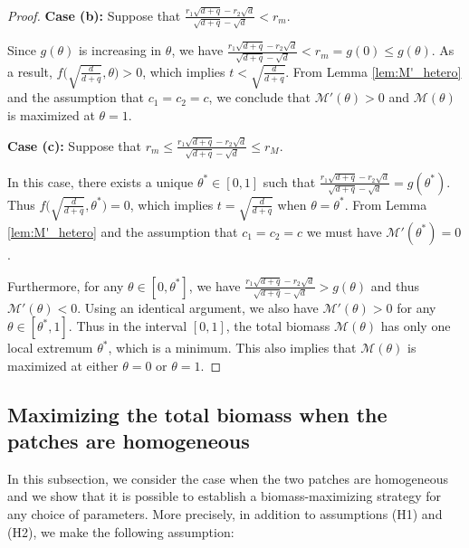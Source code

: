 \documentclass[11pt]{article}
\def\MM{\mathcal{M}}
\theoremstyle{definition}
\begin{document}
\begin{proof}
\vspace{.1in}
\noindent\textbf{Case (b):} Suppose that
$\frac{r_1\sqrt{d+q}-r_2\sqrt{d}}{\sqrt{d+q}-\sqrt{d}}<r_m$.

Since $g(\theta)$ is increasing in $\theta$, we have $\frac{r_1\sqrt{d+q}-r_2\sqrt{d}}{\sqrt{d+q}-\sqrt{d}}<r_m=g(0)\leq g(\theta)$. As a result, 
$f\big(\sqrt{\frac{d}{d+q}},\theta\big) >0$, which implies $t<\sqrt{\frac{d}{d+q}}$. From Lemma \ref{lem:M'_hetero} and the assumption that $c_1=c_2=c$, we  conclude that $\MM'(\theta)>0$ and $\MM(\theta)$ is maximized at $\theta=1$.

\vspace{.1in}
\noindent\textbf{Case (c):} Suppose that $r_m\leq \frac{r_1\sqrt{d+q}-r_2\sqrt{d}}{\sqrt{d+q}-\sqrt{d}}\leq r_M$.
\vspace{.1in}

In this case, there exists a unique $\theta^*\in[0,1]$ such that $\frac{r_1\sqrt{d+q}-r_2\sqrt{d}}{\sqrt{d+q}-\sqrt{d}}=g(\theta^*)$. Thus $f\big(\sqrt{\frac{d}{d+q}},\theta^*\big) =0$, which  implies $t=\sqrt{\frac{d}{d+q}}$ when $\theta=\theta^*$. From Lemma \ref{lem:M'_hetero} and the assumption that $c_1=c_2=c$ we must have $\MM'(\theta^*)=0$. 

Furthermore, for any $\theta\in[0,\theta^*]$, we have $\frac{r_1\sqrt{d+q}-r_2\sqrt{d}}{\sqrt{d+q}-\sqrt{d}}>g(\theta)$ and thus $\MM'(\theta)<0$. Using an identical argument, we also have $\MM'(\theta)>0$ for any $\theta\in[\theta^*,1]$. Thus in the interval $[0,1]$, the total biomass $\MM(\theta)$ has only one local extremum $\theta^*$, which is a minimum. This also implies that $\MM(\theta)$ is maximized at either $\theta=0$ or $\theta=1$.
\end{proof}

\subsection{Maximizing the total biomass when the patches are homogeneous}\label{sec:biomass_hom}


In this subsection, we consider the case when the two patches are homogeneous and we show that it is possible to establish a biomass-maximizing strategy for any choice of parameters. More precisely, in addition to assumptions (H1) and (H2), we make the following assumption:
\end{document}
